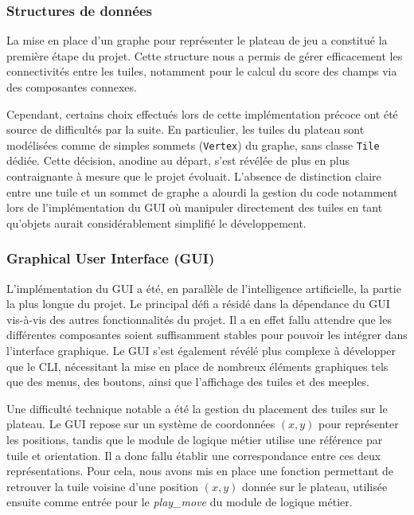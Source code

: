 \documentclass[11pt]{article}
\begin{document}
\subsubsection{Structures de données}

La mise en place d'un graphe pour représenter le plateau de jeu a 
constitué la première étape du projet. Cette structure nous a permis 
de gérer efficacement les connectivités entre les tuiles, notamment 
pour le calcul du score des champs via des composantes connexes.

Cependant, certains choix effectués lors de cette implémentation 
précoce ont été source de difficultés par la suite. En particulier, 
les tuiles du plateau sont modélisées comme de simples sommets 
(\texttt{Vertex}) du graphe, sans classe \texttt{Tile} dédiée. 
Cette décision, anodine au départ, s'est révélée de plus en plus 
contraignante à mesure que le projet évoluait. L'absence de 
distinction claire entre une tuile et un sommet de graphe a alourdi 
la gestion du code notamment lors de l'implémentation du GUI où 
manipuler directement des tuiles en tant qu'objets aurait 
considérablement simplifié le développement.
\subsubsection{Graphical User Interface (GUI)}

L'implémentation du GUI a été, en parallèle de l'intelligence 
artificielle, la partie la plus longue du projet. Le principal défi a 
résidé dans la dépendance du GUI vis-à-vis des autres fonctionnalités 
du projet. Il a en effet fallu attendre que les différentes composantes 
soient suffisamment stables pour pouvoir les intégrer dans l'interface 
graphique. Le GUI s'est également révélé plus complexe à développer que 
le CLI, nécessitant la mise en place de nombreux éléments graphiques 
tels que des menus, des boutons, ainsi que l'affichage des tuiles et 
des meeples.

Une difficulté technique notable a été la gestion du placement des 
tuiles sur le plateau. Le GUI repose sur un système de coordonnées 
$(x, y)$ pour représenter les positions, tandis que le module de logique 
métier utilise une référence par tuile et orientation. Il a donc fallu 
établir une correspondance entre ces deux représentations. Pour cela, 
nous avons mis en place une fonction permettant de retrouver la tuile 
voisine d'une position $(x, y)$ donnée sur le plateau, utilisée ensuite 
comme entrée pour le \textit{play\_move} du module de logique métier.
\end{document}
